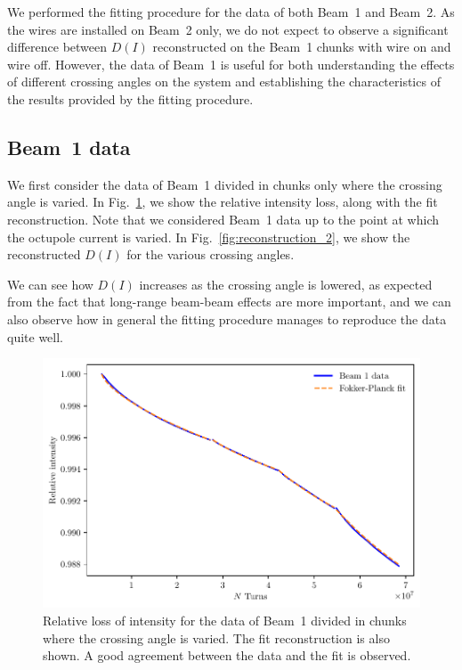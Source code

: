 We performed the fitting procedure for the data of both Beam~1 and Beam~2. As the wires are installed on Beam~2 only, we do not expect to observe a significant difference between $D(I)$ reconstructed on the Beam~1 chunks with wire on and wire off. However, the data of Beam~1 is useful for both understanding the effects of different crossing angles on the system and establishing the characteristics of the results provided by the fitting procedure.

\subsection*{Beam~1 data}

We first consider the data of Beam~1 divided in chunks only where the crossing angle is varied. In Fig.~\ref{fig:reconstruction_1}, we show the relative intensity loss, along with the fit reconstruction. Note that we considered Beam~1 data up to the point at which the octupole current is varied. In Fig.~\ref{fig:reconstruction_2}, we show the reconstructed $D(I)$ for the various crossing angles.

We can see how $D(I)$ increases as the crossing angle is lowered, as expected from the fact that long-range beam-beam effects are more important, and we can also observe how in general the fitting procedure manages to reproduce the data quite well. %

\begin{figure}[hpt]
    \centering
    \includegraphics[width=1.0\textwidth]{5_wire_compensators_LHC/figs/losses_b1.pdf}
    \caption{Relative loss of intensity for the data of Beam~1 divided in chunks where the crossing angle is varied. The fit reconstruction is also shown. A good agreement between the data and the fit is observed.}
    \label{fig:reconstruction_1}
\end{figure}

